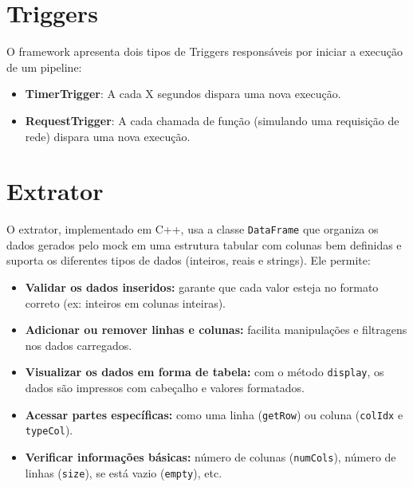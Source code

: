 \documentclass[a4paper,12pt]{article}
\begin{document}
\section{Triggers}
O framework apresenta dois tipos de Triggers responsáveis por iniciar a execução de um pipeline:

\begin{itemize}
    \item \textbf{TimerTrigger}: A cada X segundos dispara uma nova execução.
    \item \textbf{RequestTrigger}: A cada chamada de função (simulando uma requisição de rede) dispara uma nova
execução.
\end{itemize}

\section{Extrator}

O  extrator, implementado em C++, usa a classe \texttt{DataFrame} que organiza os dados gerados pelo mock em uma estrutura tabular com colunas bem definidas e suporta os diferentes tipos de dados (inteiros, reais e strings). Ele permite:

\begin{itemize}
    \item \textbf{Validar os dados inseridos:} garante que cada valor esteja no formato correto (ex: inteiros em colunas inteiras).
    
    \item \textbf{Adicionar ou remover linhas e colunas:} facilita manipulações e filtragens nos dados carregados.
    
    \item \textbf{Visualizar os dados em forma de tabela:} com o método \texttt{display}, os dados são impressos com cabeçalho e valores formatados.
    
    \item \textbf{Acessar partes específicas:} como uma linha (\texttt{getRow}) ou coluna (\texttt{colIdx} e \texttt{typeCol}).
    
    \item \textbf{Verificar informações básicas:} número de colunas (\texttt{numCols}), número de linhas (\texttt{size}), se está vazio (\texttt{empty}), etc.
\end{itemize}

\vspace{1em}
\end{document}
